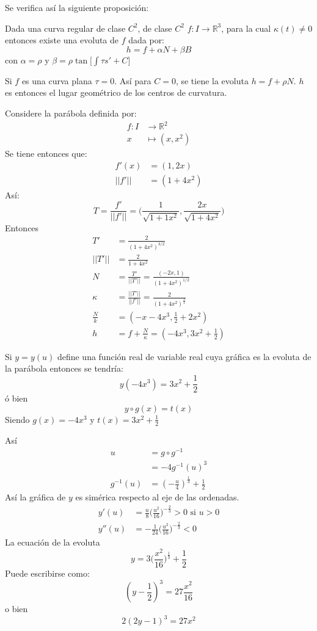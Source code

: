 Se verifica así la siguiente proposición:
\begin{proposition}
  Dada una curva regular de clase $C^2$, de clase $C^2$ $f: I \to \mathbb{R}^3$,
  para la cual $\kappa(t) \neq 0$ entonces existe una evoluta de $f$ dada por:
  \[
    h = f + \alpha N + \beta B
  \]
  con $\alpha = \rho$ y  $\beta = \rho \tan \big[\int \tau s' + C\big]$
\end{proposition}
\begin{remark}
 Si $f$ es una curva plana $\tau = 0$. Así para $C = 0$, se tiene la evoluta $h
 = f + \rho N$. $h$ es entonces el lugar geométrico de los centros de curvatura.
\end{remark}
Considere la parábola definida por:
\begin{align*}
  f:I &\to \mathbb{R}^2  \\
  x &\mapsto (x,x^2)
\end{align*}
Se tiene entonces que:
\begin{align*}
  f'(x) &= (1,2x) \\
  || f' || &= (1+ 4x^2)
\end{align*}
Así:
\[
  T = \frac{f'}{||f'||} = \big( \frac{1}{\sqrt{1+1x^2}}, \frac{2x}{\sqrt{1+4x^2}}\big)
\]
Entonces 
\begin{align*}
  T' &= \frac{2}{(1 + 4x^2)^{3 /2}}  \\
  ||T'|| &= \frac{2}{1+4x^2} \\
  N &= \frac{T'}{||T'||} = \frac{(-2x,1)}{(1+4x^2)^{1 / 2}} \\
  \kappa &= \frac{||T'||}{||f'||} = \frac{2}{(1+4x^2)^{\frac{3}{2}}} \\
  \frac{N}{k} &= (-x - 4x^3 , \frac{1}{2} + 2x^2) \\
  h &= f + \frac{N}{\kappa} = (-4x^3, 3x^2 +\frac{1}{2})
\end{align*}

Si $y = y(u)$ define una función real de variable real cuya gráfica es la
evoluta de la parábola entonces se tendría:
\[
  y(-4x^3) = 3x^2 + \frac{1}{2}
\]
ó bien
\[
  y \circ g(x) = t(x)
\]
Siendo $g(x) = -4x^3$ y $t(x) = 3x^2 + \frac{1}{2}$

Así
\begin{align*}
  u &= g \circ g^{-1} \\
    &= -4 g^{-1} (u)^3 \\
  g^{-1}(u) &= (-\frac{u}{4})^{\frac{1}{3}} + \frac{1}{2}  
\end{align*}
Así la gráfica de $y$ es simérica respecto al eje de las ordenadas.
\begin{align*}
  y'(u)  &= \frac{u}{8}\big( \frac{u^2}{16} \big)^{-\frac{2}{3}} > 0 \mbox{ si } u>0\\
y''(u) &= - \frac{1}{24} \big(\frac{u^2}{16} \big)^{-\frac{2}{3}} < 0
\end{align*}
La ecuación de la evoluta 
\[
  y = 3 \big( \frac{x^2}{16} \big)^{\frac{1}{3}} + \frac{1}{2}
\]
Puede escribirse como:
\[
  (y - \frac{1}{2})^3 = 27 \frac{x^2}{16}
\]
o bien
\begin{equation}\label{evoluta:lambda}
  2(2y - 1)^3 = 27x^2
\end{equation}



